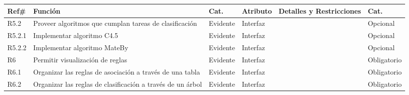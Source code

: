 \begin{center}
\begin{tabular}{|l|p{4cm}|l|l|p{4cm}|l|}\hline
\textbf{Ref\#} & \textbf{Funci\'on} & \textbf{Cat.} & \textbf{Atributo} & \textbf{Detalles y Restricciones} &
\textbf{Cat.} \\ \hline
R5.2 & Proveer algoritmos que cumplan tareas de clasificaci\'on & Evidente & Interfaz &  & Opcional \\ \hline
R5.2.1 & Implementar algoritmo C4.5 & Evidente & Interfaz &  & Opcional \\ \hline
R5.2.2 & Implementar algoritmo MateBy & Evidente & Interfaz &  & Opcional \\ \hline
R6 & Permitir visualizaci\'on de reglas & Evidente & Interfaz &  & Obligatorio \\ \hline
R6.1 & Organizar las reglas de asociaci\'on a trav\'es de una tabla & Evidente & Interfaz &  & Obligatorio \\
\hline
R6.2 & Organizar las reglas de clasificaci\'on a trav\'es de un \'arbol & Evidente & Interfaz &  &
Obligatorio \\ \hline
\end{tabular}
\end{center}

%
